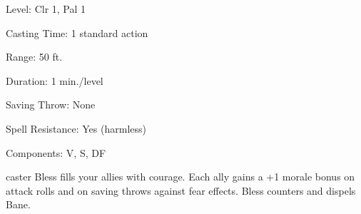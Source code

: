 
\begin{description*}
\item[Level:] Clr 1, Pal 1
\item[Casting Time:] 1 standard action
\item[Range:] 50 ft.
\item[Duration:] 1 min./level
\item[Saving Throw:] None
\item[Spell Resistance:] Yes (harmless)
\item[Components:] V, S, DF
\end{description*}

caster
Bless fills your allies with courage. Each ally gains a +1 morale bonus
on attack rolls and on saving throws against fear effects.
Bless counters and dispels Bane.